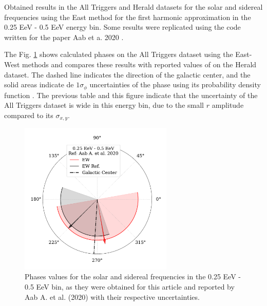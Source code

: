 \documentclass[12pt, doublespace, oneside]{article}
\begin{document}
\begin{table}[H]
\begin{small}
\begin{center}
        \end{center}
    \end{small}
    \vspace*{-0.5 cm}
    \caption{Obtained results in the All Triggers and Herald datasets for the solar and sidereal frequencies using the East method for the first harmonic approximation in the 0.25 EeV - 0.5 EeV energy bin. Some results were replicated using the code written for the paper Aab et a. 2020 \cite{Aab_2020}.}
    \label{tab:primer_bin_data}
\end{table}

The Fig. \ref{fig:primer} shows calculated phases on the All Triggers dataset using the East-West methods and compares these results with reported values of \cite{Aab_2020} on the Herald dataset. The dashed line indicates the direction of the galactic center, and the solid areas indicate de $1\sigma_{\phi}$ uncertainties of the phase using its probability density function  \cite{linsley1975fluctuation}. The previous table and this figure indicate that the uncertainty of the All Triggers dataset is wide in this energy bin,  due to the small $r$ amplitude compared to its $\sigma_{x,y}$.

\begin{figure}[H]
    \begin{small}
        \begin{center}
            \vspace*{-.5 cm}
            \includegraphics[width=0.65\textwidth]{Figs/phase_primer_bin_v3.pdf}
            \vspace*{-1 cm}
        \end{center}
        \caption{Phases values for the solar and sidereal frequencies in the 0.25 EeV - 0.5 EeV bin, as they were obtained for this article and reported by  Aab A. et al. (2020) \cite{Aab_2020} with their respective uncertainties. }
        \label{fig:primer}
    \end{small}
\end{figure}
\end{document}
